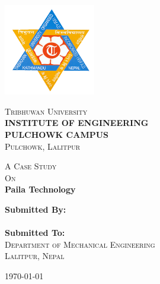 \begin{titlepage}
  \begin{center}

    \includegraphics[width=40mm]{tu}\par\vspace{0.8cm}
    \textsc{\LARGE Tribhuwan University}\\[1cm]
    \textsc{\bfseries INSTITUTE OF ENGINEERING}\\
    \textsc{\bfseries PULCHOWK CAMPUS}\\
    \textsc{Pulchowk, Lalitpur}\\
    \vspace{0.8cm}

    \textsc{\Large A Case Study}\\[0.5cm]
    \textsc{On}\\
    {\huge \bfseries Paila Technology\\[0.4cm]}

    \vfill
    {\Large \bfseries Submitted By:\\}
    \noindent{}\\[1cm]

    {\Large \bfseries Submitted To:\\}
    \textsc{Department of Mechanical Engineering} \\
    \textsc{Lalitpur, Nepal}
    \\[1cm]

    \vfill

    {\large \today}

  \end{center}
\end{titlepage}
